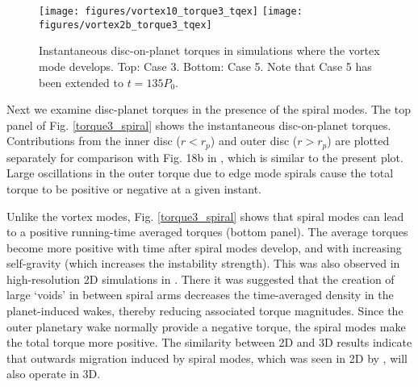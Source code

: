 \begin{figure}
  \centering
  \texttt{[image: figures/vortex10\_torque3\_tqex]}  
  \texttt{[image: figures/vortex2b\_torque3\_tqex]} 
  \caption{Instantaneous disc-on-planet torques in simulations where the vortex mode develops. 
    Top: Case 3. Bottom: Case 5. Note that Case 5 has been extended to $t=135P_0$. \label{torque3}}
\end{figure}

Next we examine disc-planet torques in the presence of the spiral
modes. The top panel of Fig. \ref{torque3_spiral} shows the
instantaneous disc-on-planet torques. Contributions from the
inner disc ($r < r_p$) and outer disc ($r > r_p$) are plotted
separately for comparison with Fig. 18b in \cite{lin11b}, which is 
similar to the present plot. Large oscillations in the outer torque
due to edge mode spirals cause the total torque to be positive or
negative at a given instant. 

Unlike the vortex modes, Fig. \ref{torque3_spiral} shows that spiral
modes can lead to a positive running-time averaged torques (bottom panel). 
The average torques become more positive with time after spiral modes develop, 
and with increasing self-gravity (which increases the instability strength). 
This was also observed in high-resolution 2D simulations in
\cite{lin11b}. There it was suggested that the creation of large   
`voids' in between spiral arms decreases the time-averaged density in  
the planet-induced wakes, thereby reducing associated torque
magnitudes. Since the outer planetary wake normally provide a negative
torque, the spiral modes make the total torque more positive. 
The similarity between 2D and 3D results indicate that
outwards migration induced by spiral modes, which was seen in 2D by
\cite{lin11b,lin12b}, will also operate in 3D.      



